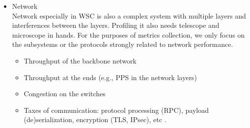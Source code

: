\begin{itemize}
\begin{itemize}
  \item Network \\
    Network especially in WSC is also a complex system with multiple layers and interferences between the layers. Profiling it also needs telescope and microscope in hands. For the purposes of metrics collection, we only focus on the subsystems or the protocols strongly related to network performance.
    \begin{itemize}
      \item Throughput of the backbone network \autocite{DBLP:series/synthesis/2018Barroso}
      \item Throughput at the ends (e.g., PPS in the network layers) \autocite{DBLP:conf/conext/BarbetteKMK19, DBLP:conf/usenix/HedayatiSSM19}
      \item Congestion on the switches \autocite{DBLP:conf/sigcomm/AlizadehGMPPPSS10}
      \item Taxes of communication: protocol processing (RPC), payload (de)serialization, encryption (TLS, IPsec), etc \autocite{DBLP:journals/micro/KanevDHRMWB16}.


\end{itemize}
\end{itemize}
\end{itemize}
